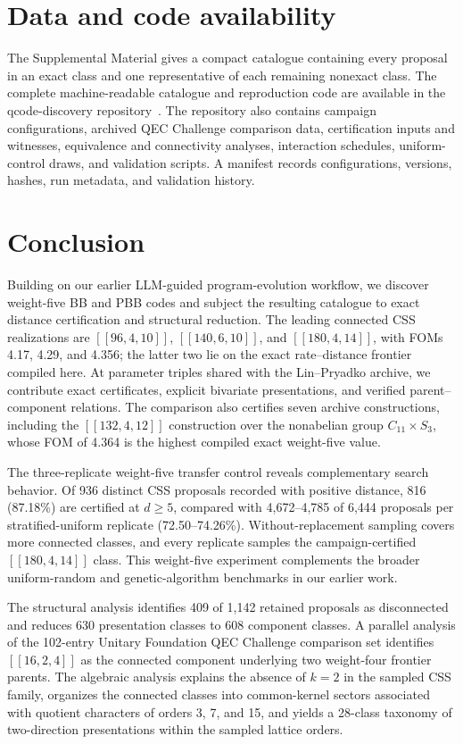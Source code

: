 \documentclass[aps,prx,twocolumn,superscriptaddress,nofootinbib,floatfix]{revtex4-2}
\newcommand{\code}[1]{\ensuremath{\left[\!\left[#1\right]\!\right]}}
\begin{document}
\section{Data and code availability}

The Supplemental Material gives a compact catalogue containing every proposal
in an exact class and one representative of each remaining nonexact class.  The
complete machine-readable catalogue and reproduction code are available in
the qcode-discovery repository~\cite{cruzbenito2026qcode}.  The repository also
contains campaign configurations, archived QEC Challenge comparison data,
certification inputs and witnesses, equivalence and connectivity analyses,
interaction schedules, uniform-control draws, and validation scripts.  A
manifest records configurations, versions, hashes, run metadata, and validation
history.

\section{Conclusion}

Building on our earlier LLM-guided program-evolution workflow, we discover
weight-five BB and PBB codes and subject the resulting catalogue to exact
distance certification and structural reduction.  The leading connected CSS
realizations are $\code{96,4,10}$, $\code{140,6,10}$, and
$\code{180,4,14}$, with FOMs 4.17, 4.29, and 4.356; the latter two lie on the
exact rate--distance frontier compiled here.  At parameter triples shared with
the Lin--Pryadko archive, we contribute exact certificates, explicit bivariate
presentations, and verified parent--component relations.  The comparison also
certifies seven archive constructions, including the $\code{132,4,12}$
construction over the nonabelian group $C_{11}\times S_3$, whose FOM of 4.364
is the highest compiled exact weight-five value.

The three-replicate weight-five transfer control reveals complementary search
behavior.  Of 936 distinct CSS proposals recorded with positive distance, 816
(87.18\%) are certified at $d\geq5$, compared with 4,672--4,785 of 6,444
proposals per stratified-uniform replicate (72.50--74.26\%).
Without-replacement sampling
covers more connected classes, and every replicate samples the
campaign-certified $\code{180,4,14}$ class.  This weight-five experiment
complements the broader uniform-random and genetic-algorithm benchmarks in our
earlier work.

The structural analysis identifies 409 of 1,142 retained proposals as
disconnected and reduces 630 presentation classes to 608 component classes.  A
parallel analysis of the 102-entry Unitary Foundation QEC Challenge comparison
set identifies $\code{16,2,4}$ as the connected component underlying two
weight-four frontier parents.  The algebraic analysis explains the absence of
$k=2$ in the sampled CSS family, organizes the connected classes into
common-kernel sectors associated with quotient characters of orders 3, 7, and
15, and yields a 28-class taxonomy of two-direction presentations within the
sampled lattice orders.
\end{document}

